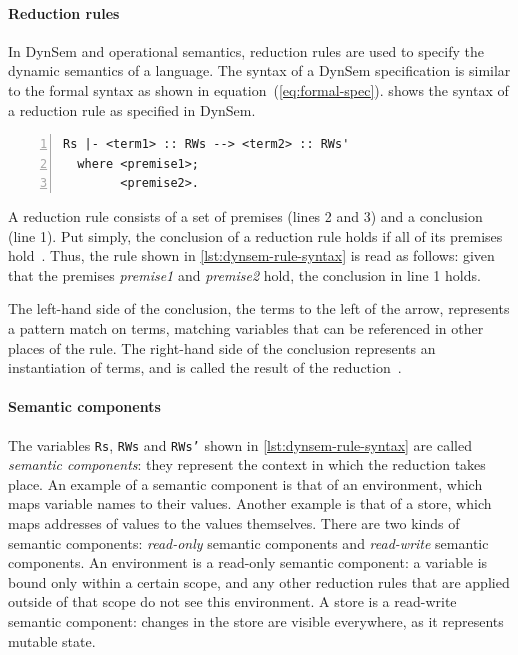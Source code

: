 \paragraph{Reduction rules} In DynSem and operational semantics, reduction rules
are used to specify the dynamic semantics of a language. The syntax of a DynSem
specification is similar to the formal syntax as shown in
equation~(\ref{eq:formal-spec}).  shows the syntax
of a reduction rule as specified in DynSem.

\begin{minipage}[t]{\linewidth}
\begin{lstlisting}[language=dynsem,numbers=left,caption={The syntactic structure
of a reduction rule in DynSem.},label={lst:dynsem-rule-syntax}]
  Rs |- <term1> :: RWs --> <term2> :: RWs'
  where <premise1>;
        <premise2>.
\end{lstlisting}
\end{minipage}

A reduction rule consists of a set of premises (lines 2 and 3) and a conclusion
(line 1). Put simply, the conclusion of a reduction rule holds if all of its
premises hold~\cite{Kahn87}. Thus, the rule shown in
\cref{lst:dynsem-rule-syntax} is read as follows: given that the premises
\textit{premise1} and \textit{premise2} hold, the conclusion in line 1 holds.

The left-hand side of the conclusion, the terms to the left of the arrow,
represents a pattern match on terms, matching variables that can be referenced
in other places of the rule. The right-hand side of the conclusion represents an
instantiation of terms, and is called the result of the
reduction~\cite{VerguNV15}.

\paragraph{Semantic components} The variables \texttt{Rs}, \texttt{RWs} and
\texttt{RWs'} shown in \cref{lst:dynsem-rule-syntax} are called \textit{semantic
  components}: they represent the context in which the reduction takes place. An
example of a semantic component is that of an environment, which maps variable
names to their values. Another example is that of a store, which maps addresses
of values to the values themselves. There are two kinds of semantic components:
\textit{read-only} semantic components and \textit{read-write} semantic
components. An environment is a read-only semantic component: a variable is
bound only within a certain scope, and any other reduction rules that are
applied outside of that scope do not see this environment. A store is a
read-write semantic component: changes in the store are visible everywhere, as
it represents mutable state.

